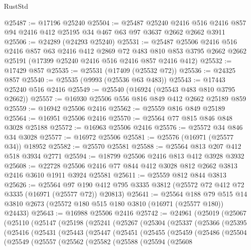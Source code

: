 \begin{lexlean}{RustStd}
\begin{coremodule}
@25487 := @17196 @25240
@25504 := @25487
    @25240
    @2416
    @516
    @2416
    @857
    @94
    @2416
    @412
    @25195
    @34
    @467
    @63
    @97
    @3637
    @2662
    @2662
    @3911
@25506 := @24289 (@24293 @25240)
@25531 := @25487
    @25506
    @2416
    @516
    @2416
    @857
    @63
    @2416
    @412
    @2869
    @72
    @483
    @810
    @853
    @3795
    @2662
    @2662
    @25191
    (@17399 @25240 @2416 @516 @2416 @857 @2416 @412)
@25532 := @17429 @857
@25535 := @25531 (@17409 (@25532 @72))
@25536 := @24325 @857
@25540 := @25535 (@9993 (@25536 @63 @483))
@25543 := @17443 @25240 @516 @2416
@25549 := @25540 (@16924 (@25543 @483 @810 @3795 @2662))
@25557 := @16930 @25506 @556 @816 @849 @412 @2662 @25189 @859
@25559 := @16942 @25506 @2416
@25562 := @25559 @816 @849 @25189
@25564 := @16951 @25506 @2416
@25570 := @25564 @77 @815 @846 @848 @3028 @25188
@25572 := @16963 @25506 @2416
@25576 := @25572 @34 @846 @34 @3028
@25577 := @16972 @25506
@25581 := @25576 (@16971 (@25577 @34)) @18952
@25582 := @25570 @25581
@25588 := @25564 @813 @207 @412 @518 @3934 @2771
@25594 := @18799 @25506 @2416 @813 @412 @3928 @3932
@25608 := @22728 @25506 @2416 @77 @844 @412 @3028 @812 @2662 @3813 @2416 @3610 @1911 @3924 @25581
@25611 := @25559 @812 @844 @3813
@25626 := @25564
    @97
    @190
    @412
    @795
    @3335
    @3812
    (@25572 @72 @412 @72 @3335 (@16971 (@25577 @72)) @20813)
@25641 := @25564
    @188
    @79
    @515
    @14
    @3810
    @2673
    (@25572 @180 @515 @180 @3810 (@16971 (@25577 @180)) @24433)
@25643 := @16988 @25506 @2416
@25742 := @24961
    (@25019
      (@25067
        (@25110
          (@25147
            (@25198
              (@25241
                (@25267
                  (@25304
                    (@25337
                      (@25366
                        (@25395
                          (@25416
                            (@25431
                              (@25443
                                (@25447
                                  (@25451
                                    (@25455
                                      (@25459
                                        (@25486
                                          (@25504
                                            (@25549
                                              (@25557
                                                (@25562
                                                  (@25582
                                                    (@25588
                                                      (@25594
                                                        (@25608

\end{coremodule}
\end{lexlean}
